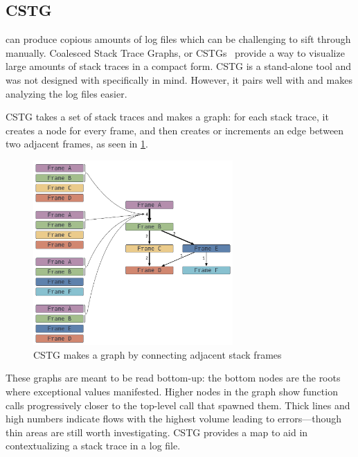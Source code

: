 \documentclass{juliacon}
\begin{document}
\subsection{CSTG}
\label{s:cstg}

\FT{} can produce copious amounts of log files which can be challenging to sift through manually.
Coalesced Stack Trace Graphs, or CSTGs~\cite{humphreySystematicDebuggingMethods2014} provide a way to visualize large amounts of stack traces in a compact form.
CSTG is a stand-alone tool and was not designed with \FT{} specifically in mind.
However, it pairs well with \FT{} and makes analyzing the log files easier.

CSTG takes a set of stack traces and makes a graph: for each stack trace, it creates a node for every frame, and then creates or increments an edge between two adjacent frames, as seen in \cref{fig:cstg_demo}.

\begin{figure}[ht]
  \centering
  \includegraphics[width=3in]{./fig/cstg_static_diagram.png}
  \caption{CSTG makes a graph by connecting adjacent stack frames}
  \label{fig:cstg_demo}
\end{figure}

These graphs are meant to be read bottom-up: the bottom nodes are the roots where exceptional values manifested.
Higher nodes in the graph show function calls progressively closer to the top-level call that spawned them.
Thick lines and high numbers indicate flows with the highest volume leading to errors---though thin areas are still worth investigating.
CSTG provides a map to aid in contextualizing a stack trace in a log file.

\subsection{\GPUFPX{}}
\label{s:gpufpx}
\end{document}
